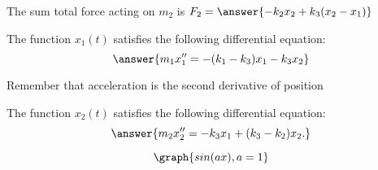 \documentclass{ximera}%
\begin{document}
\begin{problem}
The sum total force acting on $m_2$ is $F_2 = \answer{-k_2 x_2 + k_3(x_2-x_1)}$
\end{problem}

\begin{problem} The function $x_1(t)$ satisfies the following differential equation:
\[ \answer{m_1 x_1'' = -(k_1-k_3)x_1 -k_3 x_2}\]
\begin{hint} Remember that acceleration is the second derivative of position \end{hint}

\end{problem}

\begin{problem} The function $x_2(t)$ satisfies the following differential equation:
\[ \answer{ m_2 x_2'' = -k_3 x_1 + (k_3-k_2)x_2.}\]
\end{problem}

\[ \graph{sin(ax),a=1}\]
\end{document}
